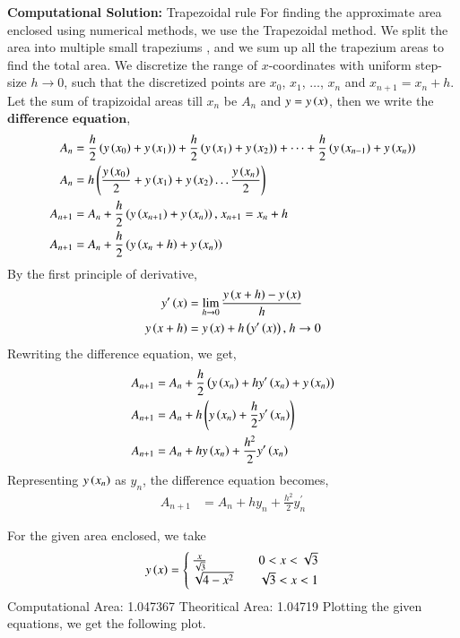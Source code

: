 \documentclass[journal]{IEEEtran}
\begin{document}
\textbf{Computational Solution:} Trapezoidal rule
\newline
For finding the approximate area enclosed using numerical methods, we use the Trapezoidal method. We split the area into multiple small trapeziums , and we sum up all the trapezium areas to find the total area. 
\newline
We discretize the range of $x$-coordinates with uniform step-size $h \to 0$, such that the discretized points are $x_0$, $x_1$, $\dots$, $x_n$ and $x_{n + 1} = x_n + h$.
\newline
Let the sum of trapizoidal areas till $x_n$ be $A_n$ and $y = y\left(x\right)$, then we write the $\textbf{difference equation}$,
\begin{align}
    A_n &= \frac{h}{2}\left(y\left(x_0\right) + y\left(x_1\right)\right) + \frac{h}{2}\left(y\left(x_1\right) + y\left(x_2\right)\right) + \dots + \frac{h}{2}\left(y\left(x_{n - 1}\right) + y\left(x_{n}\right)\right)\\
    A_n &= h\left(\frac{y\left(x_0\right)}{2} + y\left(x_1\right) + y\left(x_2\right) \dots \frac{y\left(x_n\right)}{2}\right)\\
    A_{n + 1} &= A_n + \frac{h}{2}\left(y\left(x_{n + 1}\right) + y\left(x_n\right)\right) \text{, } x_{n + 1} = x_n + h\\
    A_{n + 1} &= A_n + \frac{h}{2}\left(y\left(x_n + h\right) + y\left(x_n\right)\right)\\
\end{align}
By the first principle of derivative,
\begin{align}
    y^{\prime}\left(x\right) &= \lim_{h\to0} \frac{y\left(x + h\right) - y\left(x\right)}{h}\\
    y\left(x + h\right) &= y\left(x\right) + h\left(y^{\prime}\left(x\right)\right) \text{, } h\to0
\end{align}
Rewriting the difference equation, we get,
\begin{align}
    A_{n + 1} &= A_n + \frac{h}{2}\left(y\left(x_n\right) + hy^{\prime}\left(x_n\right) + y\left(x_n\right)\right)\\
    A_{n + 1} &= A_n + h\left(y\left(x_n\right) + \frac{h}{2}y^{\prime}\left(x_n\right)\right)\\
    A_{n + 1} &= A_n + hy\left(x_n\right) + \frac{h^2}{2}y^{\prime}\left(x_n\right)
\end{align}
Representing $y\left(x_n\right)$ as $y_n$, the difference equation becomes,
\begin{align}
    A_{n + 1} &= A_n + hy_n + \frac{h^2}{2}y_n^{\prime}
\end{align}

For the given area enclosed, we take
\begin{align}
    y\left(x\right) =
    \begin{cases}
        \frac{x}{\sqrt{3}} & \quad 0 < x < \sqrt{3}\\
        \sqrt{4 - x^2} & \quad \sqrt{3} < x < 1
    \end{cases}
\end{align}
Computational Area: 1.047367
\newline
Theoritical Area: 1.04719
\newline
Plotting the given equations, we get the following plot.
\end{document}
